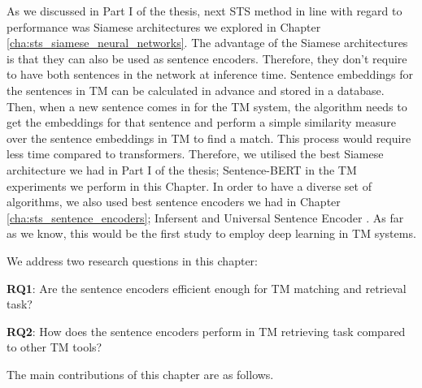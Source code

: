 As we discussed in Part I of the thesis, next STS method in line with regard to performance was Siamese architectures we explored in Chapter \ref{cha:sts_siamese_neural_networks}. The advantage of the Siamese architectures is that they can also be used as sentence encoders. Therefore, they don't require to have both sentences in the network at inference time. Sentence embeddings for the sentences in TM can be calculated in advance and stored in a database. Then, when a new sentence comes in for the TM system, the algorithm needs to get the embeddings for that sentence and perform a simple similarity measure over the sentence embeddings in TM to find a match. This process would require less time compared to transformers. Therefore, we utilised the best Siamese architecture we had in Part I of the thesis; Sentence-BERT \autocite{reimers-gurevych-2019-sentence} in the TM experiments we perform in this Chapter. In order to have a diverse set of algorithms, we also used best sentence encoders we had in Chapter \ref{cha:sts_sentence_encoders}; Infersent \autocite{conneau-EtAl:2017:EMNLP2017} and Universal Sentence Encoder \autocite{cer2018universal}. As far as we know, this would be the first study to employ deep learning in TM systems. 

We address two research questions in this chapter:

\textbf{RQ1}: Are the sentence encoders efficient enough for TM matching and retrieval task?

\textbf{RQ2}: How does the sentence encoders perform in TM retrieving task compared to other TM tools?

The main contributions of this chapter are as follows.

